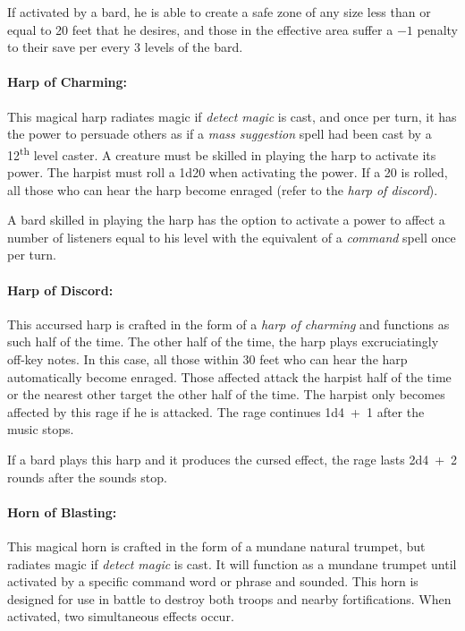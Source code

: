 \begin{multicols}{2}
If activated by a bard, he is able to create a safe zone of any size less than or equal to 20 feet that he desires, and those in the effective area suffer a $-1$ penalty to their save per every 3 levels of the bard.  

\paragraph{Harp of Charming:} This magical harp radiates magic if \textit{detect magic} is cast, and once per turn, it has the power to persuade others as if a \textit{mass suggestion} spell had been cast by a 12\textsuperscript{th} level caster.  A creature must be skilled in playing the harp to activate its power.  The harpist must roll a 1d20 when activating the power.  If a 20 is rolled, all those who can hear the harp become enraged (refer to the \textit{harp of discord}).

A bard skilled in playing the harp has the option to activate a power to affect a number of listeners equal to his level with the equivalent of a \textit{command} spell once per turn.

\paragraph{Harp of Discord:} This accursed harp is crafted in the form of a \textit{harp of charming} and functions as such half of the time.  The other half of the time, the harp plays excruciatingly off-key notes.  In this case, all those within 30 feet who can hear the harp automatically become enraged.  Those affected attack the harpist half of the time or the nearest other target the other half of the time.  The harpist only becomes affected by this rage if he is attacked.  The rage continues 1d4~+~1 after the music stops.

If a bard plays this harp and it produces the cursed effect, the rage lasts 2d4~+~2 rounds after the sounds stop. 

\paragraph{Horn of Blasting:} This magical horn is crafted in the form of a mundane natural trumpet, but radiates magic if \textit{detect magic} is cast.  It will function as a mundane trumpet until activated by a specific command word or phrase and sounded.  This horn is designed for use in battle to destroy both troops and nearby fortifications.  When activated, two simultaneous effects occur.


\end{multicols}
